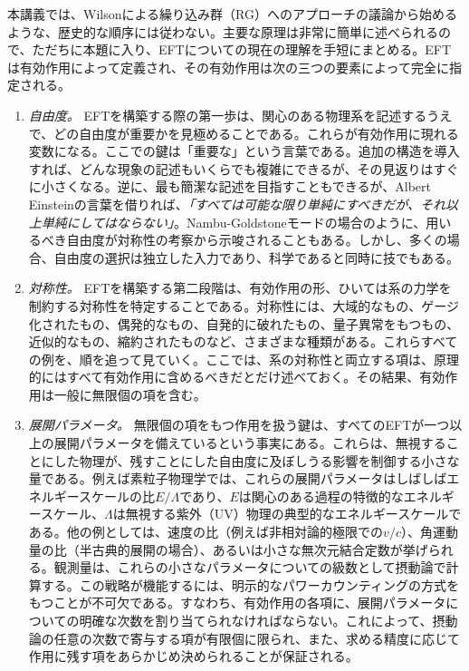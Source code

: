 本講義では、Wilsonによる繰り込み群（RG）へのアプローチの議論から始めるような、歴史的な順序には従わない。主要な原理は非常に簡単に述べられるので、ただちに本題に入り、EFTについての現在の理解を手短にまとめる。EFTは有効作用によって定義され、その有効作用は次の三つの要素によって完全に指定される。
%
\begin{enumerate}
\item {\it 自由度。} EFTを構築する際の第一歩は、関心のある物理系を記述するうえで、どの自由度が重要かを見極めることである。これらが有効作用に現れる変数になる。ここでの鍵は「重要な」という言葉である。追加の構造を導入すれば、どんな現象の記述もいくらでも複雑にできるが、その見返りはすぐに小さくなる。逆に、最も簡潔な記述を目指すこともできるが、Albert Einsteinの言葉を借りれば、{\it 「すべては可能な限り単純にすべきだが、それ以上単純にしてはならない」}。Nambu-Goldstoneモードの場合のように、用いるべき自由度が対称性の考察から示唆されることもある。しかし、多くの場合、自由度の選択は独立した入力であり、科学であると同時に技でもある。
\item {\it 対称性。} EFTを構築する第二段階は、有効作用の形、ひいては系の力学を制約する対称性を特定することである。対称性には、大域的なもの、ゲージ化されたもの、偶発的なもの、自発的に破れたもの、量子異常をもつもの、近似的なもの、縮約されたものなど、さまざまな種類がある。これらすべての例を、順を追って見ていく。ここでは、系の対称性と両立する項は、原理的にはすべて有効作用に含めるべきだとだけ述べておく。その結果、有効作用は一般に無限個の項を含む。
\item {\it 展開パラメータ。} 無限個の項をもつ作用を扱う鍵は、すべてのEFTが一つ以上の展開パラメータを備えているという事実にある。これらは、無視することにした物理が、残すことにした自由度に及ぼしうる影響を制御する小さな量である。例えば素粒子物理学では、これらの展開パラメータはしばしばエネルギースケールの比$E / \Lambda$であり、$E$は関心のある過程の特徴的なエネルギースケール、$\Lambda$は無視する紫外（UV）物理の典型的なエネルギースケールである。他の例としては、速度の比（例えば非相対論的極限での$v/c$）、角運動量の比（半古典的展開の場合）、あるいは小さな無次元結合定数が挙げられる。観測量は、これらの小さなパラメータについての級数として摂動論で計算する。この戦略が機能するには、明示的なパワーカウンティングの方式をもつことが不可欠である。すなわち、有効作用の各項に、展開パラメータについての明確な次数を割り当てられなければならない。これによって、摂動論の任意の次数で寄与する項が有限個に限られ、また、求める精度に応じて作用に残す項をあらかじめ決められることが保証される。
\end{enumerate}
%

